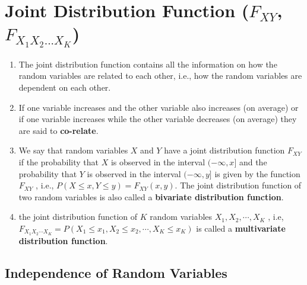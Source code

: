 \section{Joint Distribution Function ($F _{X Y}$, $F _{X_1 X_2 ... X _K} $)}

\begin{enumerate}
    \item The joint distribution function contains all the information on how the random variables are related to each other, i.e., how the random variables are dependent on each other.
    \hfill \cite{statistics/book/Statistics-for-Data-Scientists/Maurits-Kaptein}

    \item If one variable increases and the other variable also increases (on average) or if one variable increases while the other variable decreases (on average) they are said to \textbf{co-relate}.
    \hfill \cite{statistics/book/Statistics-for-Data-Scientists/Maurits-Kaptein}

    \item We say that random variables $X$ and $Y$ have a joint distribution function $F _{X Y}$ if the probability that $X$ is observed in the interval $(-\infty, x]$ and the probability that $Y$ is observed in the interval $(-\infty, y]$ is given by the function $F _{X Y}$ , i.e., $P (X \leq x, Y \leq y) = F _{X Y} (x, y)$.
    The joint distribution function of two random variables is also called a \textbf{bivariate distribution function}.
    \hfill \cite{statistics/book/Statistics-for-Data-Scientists/Maurits-Kaptein}

    \item the joint distribution function of $K$ random variables $X_1, X_2, \cdots , X_K$ , i.e,
    $F _{X_1 X_2 \cdots X _K} = P(X_1 \leq x_1, X_2 \leq x_2, \cdots , X_K \leq x_K )$
    is called a \textbf{multivariate distribution function}.
    \hfill \cite{statistics/book/Statistics-for-Data-Scientists/Maurits-Kaptein}
\end{enumerate}



\subsection{Independence of Random Variables}

